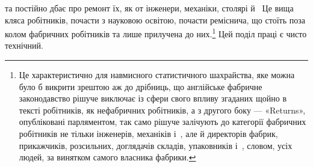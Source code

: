 \parcont{}  %
та постійно дбає про ремонт їх, як от інженери, механіки, столярі
й~ Це вища кляса робітників, почасти з науковою освітою,
почасти реміснича, що стоїть поза колом фабричних робітників
та лише прилучена до них.\footnote{
Це характеристично для навмисного статистичного шахрайства,
яке можна було б викрити зрештою аж до дрібниць, що англійське фабричне
законодавство рішуче виключає із сфери свого впливу згаданих щойно
в тексті робітників, як нефабричних робітників, а з другого боку —
«Returns», опубліковані парляментом, так само рішуче залічують до
категорії фабричних робітників не тільки інженерів, механіків і~,
але й директорів фабрик, прикажчиків, розсильних, доглядачів складів,
упаковників і~, словом, усіх людей, за винятком самого власника
фабрики.
} Цей поділ праці є чисто технічний.

